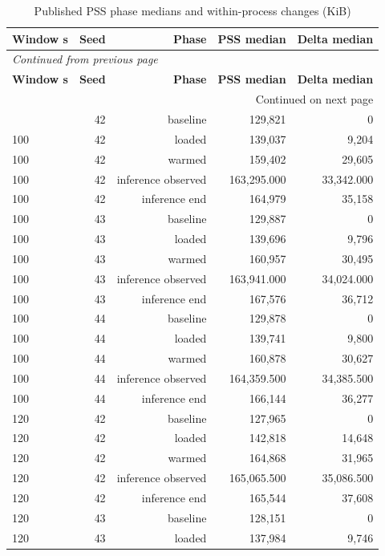 \documentclass[10pt,a4paper]{article}
\begin{document}
\begin{longtable}{@{}lrrrr@{}}
\caption{Published PSS phase medians and within-process changes (KiB)}\\
\toprule
\textbf{Window s} & \textbf{Seed} & \textbf{Phase} & \textbf{PSS median} & \textbf{Delta median} \\
\midrule\endfirsthead
\multicolumn{5}{l}{\small\itshape Continued from previous page}\\
\toprule
\textbf{Window s} & \textbf{Seed} & \textbf{Phase} & \textbf{PSS median} & \textbf{Delta median} \\
\midrule\endhead
\midrule\multicolumn{5}{r}{\small Continued on next page}\\\endfoot
\bottomrule\endlastfoot
100 & 42 & baseline & 129,821 & 0 \\
100 & 42 & loaded & 139,037 & 9,204 \\
100 & 42 & warmed & 159,402 & 29,605 \\
100 & 42 & inference observed & 163,295.000 & 33,342.000 \\
100 & 42 & inference end & 164,979 & 35,158 \\
100 & 43 & baseline & 129,887 & 0 \\
100 & 43 & loaded & 139,696 & 9,796 \\
100 & 43 & warmed & 160,957 & 30,495 \\
100 & 43 & inference observed & 163,941.000 & 34,024.000 \\
100 & 43 & inference end & 167,576 & 36,712 \\
100 & 44 & baseline & 129,878 & 0 \\
100 & 44 & loaded & 139,741 & 9,800 \\
100 & 44 & warmed & 160,878 & 30,627 \\
100 & 44 & inference observed & 164,359.500 & 34,385.500 \\
100 & 44 & inference end & 166,144 & 36,277 \\
120 & 42 & baseline & 127,965 & 0 \\
120 & 42 & loaded & 142,818 & 14,648 \\
120 & 42 & warmed & 164,868 & 31,965 \\
120 & 42 & inference observed & 165,065.500 & 35,086.500 \\
120 & 42 & inference end & 165,544 & 37,608 \\
120 & 43 & baseline & 128,151 & 0 \\
120 & 43 & loaded & 137,984 & 9,746 \\

\end{longtable}
\end{document}
